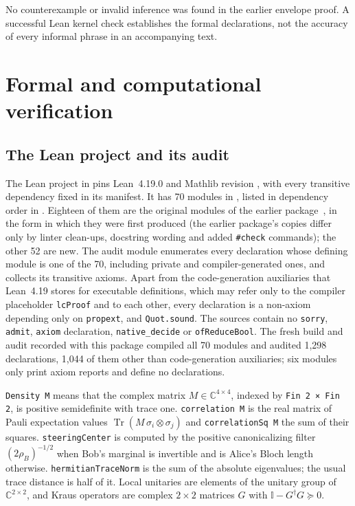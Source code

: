 \documentclass[11pt,a4paper]{article}
\theoremstyle{remark}\newtheorem{remark}[theorem]{Remark}
\newcommand{\Tr}{\operatorname{Tr}}
\newcommand{\Id}{\mathbb I}
\newcommand{\C}{\mathbb C}
\begin{document}
No counterexample or invalid inference was found in the earlier envelope
proof. A successful Lean kernel check establishes the formal declarations,
not the accuracy of every informal phrase in an accompanying text.

\section{Formal and computational verification}\label{sec:verification}
\subsection{The Lean project and its audit}
The Lean project in  pins Lean~4.19.0 and Mathlib revision
, with every transitive
dependency fixed in its manifest. It has 70 modules in ,
listed in dependency order in . Eighteen of them are
the original modules of the earlier package~\cite{earlier}, in the form in
which they were first produced (the earlier package's copies differ only
by linter clean-ups, docstring wording and added \texttt{\#check}
commands); the other 52 are new. The audit module
 enumerates every declaration whose defining module
is one of the 70, including private and compiler-generated ones, and
collects its transitive axioms. Apart from the code-generation auxiliaries
that Lean~4.19 stores for executable definitions, which may refer only to
the compiler placeholder \texttt{lcProof} and to each other, every
declaration is a non-axiom depending only on \texttt{propext},
 and \texttt{Quot.sound}. The sources contain no
\texttt{sorry}, \texttt{admit}, \texttt{axiom} declaration,
\texttt{native\_decide} or \texttt{ofReduceBool}. The fresh build and audit
recorded with this package compiled all 70 modules and audited
1{,}298 declarations, 1{,}044 of them other than
code-generation auxiliaries; six modules only print axiom reports and
define no declarations.

\texttt{Density M} means that the complex matrix
$M\in\C^{4\times4}$, indexed by \texttt{Fin 2 × Fin 2}, is positive
semidefinite with trace one. \texttt{correlation M} is the real matrix of
Pauli expectation values $\Tr(M\,\sigma_i\otimes\sigma_j)$ and
\texttt{correlationSq M} the sum of their squares. \texttt{steeringCenter}
is computed by the positive canonicalizing filter
$(2\rho_B)^{-1/2}$ when Bob's marginal is invertible and is Alice's Bloch
length otherwise. \texttt{hermitianTraceNorm} is the sum of the absolute
eigenvalues; the usual trace distance is half of it. Local unitaries are
elements of the unitary group of $\C^{2\times2}$, and Kraus operators are
complex $2\times2$ matrices $G$ with $\Id-G^\dagger G\succeq0$.
\end{document}
